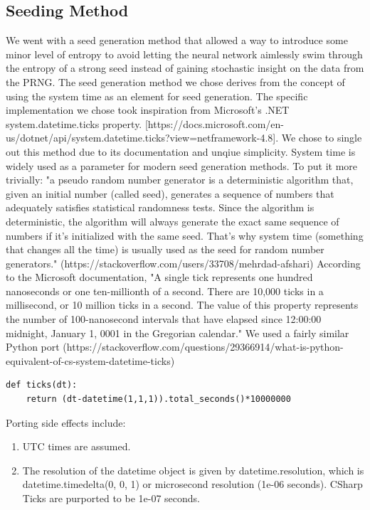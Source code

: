 \documentclass[conference]{IEEEtran}
\begin{document}
\subsection{Seeding Method}
We went with a seed generation method that allowed a way to introduce some minor level of entropy to avoid letting the neural network aimlessly swim through the entropy of a strong seed instead of gaining stochastic insight on the data from the PRNG. \newline
The seed generation method we chose derives from the concept of using the system time as an element for seed generation. The specific implementation we chose took inspiration from Microsoft's .NET system.datetime.ticks property. [https://docs.microsoft.com/en-us/dotnet/api/system.datetime.ticks?view=netframework-4.8]. We chose to single out this method due to its documentation and unqiue simplicity. System time is widely used as a parameter for modern seed generation methods. To put it more trivially: "a pseudo random number generator is a deterministic algorithm that, given an initial number (called seed), generates a sequence of numbers that adequately satisfies statistical randomness tests. Since the algorithm is deterministic, the algorithm will always generate the exact same sequence of numbers if it's initialized with the same seed. That's why system time (something that changes all the time) is usually used as the seed for random number generators." (https://stackoverflow.com/users/33708/mehrdad-afshari) \newline
According to the Microsoft documentation, "A single tick represents one hundred nanoseconds or one ten-millionth of a second. There are 10,000 ticks in a millisecond, or 10 million ticks in a second. The value of this property represents the number of 100-nanosecond intervals that have elapsed since 12:00:00 midnight, January 1, 0001 in the Gregorian calendar."  \newline
We used a fairly similar Python port 
(https://stackoverflow.com/questions/29366914/what-is-python-equivalent-of-cs-system-datetime-ticks)
\lstset{language=Python}
\begin{lstlisting}[breaklines=true]
def ticks(dt):
    return (dt-datetime(1,1,1)).total_seconds()*10000000
\end{lstlisting} 

Porting side effects include:
\begin{enumerate}
    \item UTC times are assumed.
    \item The resolution of the datetime object is given by datetime.resolution, which is datetime.timedelta(0, 0, 1) or microsecond resolution (1e-06 seconds). CSharp Ticks are purported to be 1e-07 seconds.
\end{enumerate}
\end{document}
